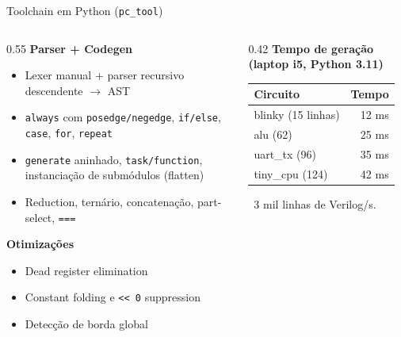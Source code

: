 \documentclass[10pt, aspectratio=169]{beamer}
\newcommand{\code}[1]{\texttt{\small #1}}
\begin{document}
\begin{frame}{Toolchain em Python (\code{pc\_tool})}
  \begin{columns}[t]
    \begin{column}{0.55\textwidth}
      \textbf{Parser + Codegen}
      \begin{itemize}
        \item Lexer manual + parser recursivo descendente $\to$ AST
        \item \code{always} com \code{posedge/negedge}, \code{if/else},
          \code{case}, \code{for}, \code{repeat}
        \item \code{generate} aninhado, \code{task/function}, instanciação
          de submódulos (flatten)
        \item Reduction, ternário, concatenação, part-select, \code{===}
      \end{itemize}
      \textbf{Otimizações}
      \begin{itemize}
        \item Dead register elimination
        \item Constant folding e \code{<< 0} suppression
        \item Detecção de borda global
      \end{itemize}
    \end{column}
    \begin{column}{0.42\textwidth}
      \textbf{Tempo de geração (laptop i5, Python 3.11)}
      \begin{center}
        \begin{tabular}{lr}
          \toprule
          Circuito & Tempo \\
          \midrule
          blinky (15 linhas) & 12 ms \\
          alu (62) & 25 ms \\
          uart\_tx (96) & 35 ms \\
          tiny\_cpu (124) & 42 ms \\
          \bottomrule
        \end{tabular}
      \end{center}
      ~3 mil linhas de Verilog/s.
    \end{column}
  \end{columns}
\end{frame}
\end{document}
